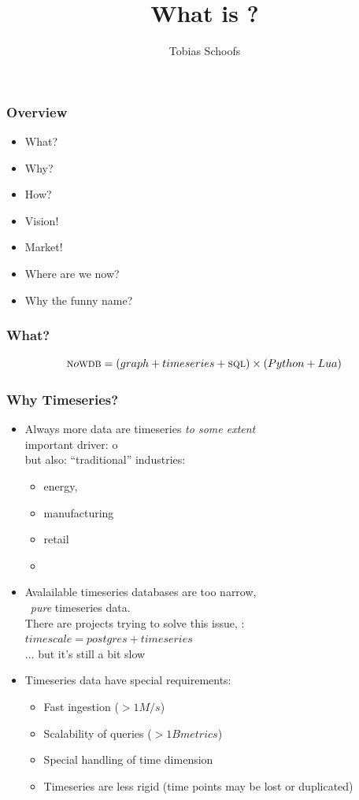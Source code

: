 \documentclass{beamer}
\title{What is \nowdb?}
\author{Tobias Schoofs}
\begin{document}
\frame{\titlepage}

\begin{frame}
\frametitle{Overview}
\begin{itemize}
\item What?
\item Why?
\item How?
\item Vision!
\item Market!
\item Where are we now?
\item Why the funny name?
\end{itemize}
\end{frame}

\begin{frame}
\frametitle{What?}
\begin{equation}
\textsc{n}o\textsc{wdb} = (graph +  timeseries + \textsc{sql}) \times (Python + Lua)
\end{equation}
\end{frame}

\begin{frame}[shrink]
\frametitle{Why Timeseries?}
\begin{itemize}
\item Always more data are timeseries \emph{to some extent}\\
      important driver: o\\
      but also: ``traditional'' industries:
      \begin{itemize} 
      \item energy,
      \item manufacturing
      \item retail
      \item \etc
      \end{itemize}
\item Avalailable timeseries databases are too narrow,\\
      \ie\ \emph{pure} timeseries data.\\
      There are projects trying to solve this issue,
      \eg:
      $timescale = postgres + timeseries$ \\
      $\dots$ but it's still a bit slow

\item Timeseries data have special requirements:
      \begin{itemize}
      \item Fast ingestion ($> 1M/s$)
      \item Scalability of queries ($> 1B metrics$)
      \item Special handling of time dimension
      \item Timeseries are less rigid
            (time points may be lost or duplicated)
      \end{itemize}
\end{itemize}
\end{frame}
\end{document}
